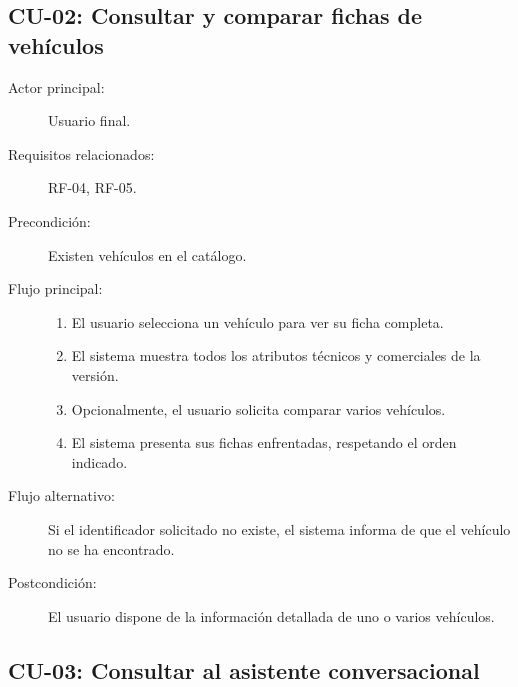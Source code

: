\subsection{CU-02: Consultar y comparar fichas de vehículos}

\begin{description}
  \item[Actor principal:] Usuario final.
  \item[Requisitos relacionados:] RF-04, RF-05.
  \item[Precondición:] Existen vehículos en el catálogo.
  \item[Flujo principal:]
        \begin{enumerate}
          \item El usuario selecciona un vehículo para ver su ficha completa.
          \item El sistema muestra todos los atributos técnicos y comerciales
                de la versión.
          \item Opcionalmente, el usuario solicita comparar varios vehículos.
          \item El sistema presenta sus fichas enfrentadas, respetando el orden
                indicado.
        \end{enumerate}
  \item[Flujo alternativo:] Si el identificador solicitado no existe, el
        sistema informa de que el vehículo no se ha encontrado.
  \item[Postcondición:] El usuario dispone de la información detallada de uno o
        varios vehículos.
\end{description}

\subsection{CU-03: Consultar al asistente conversacional}

